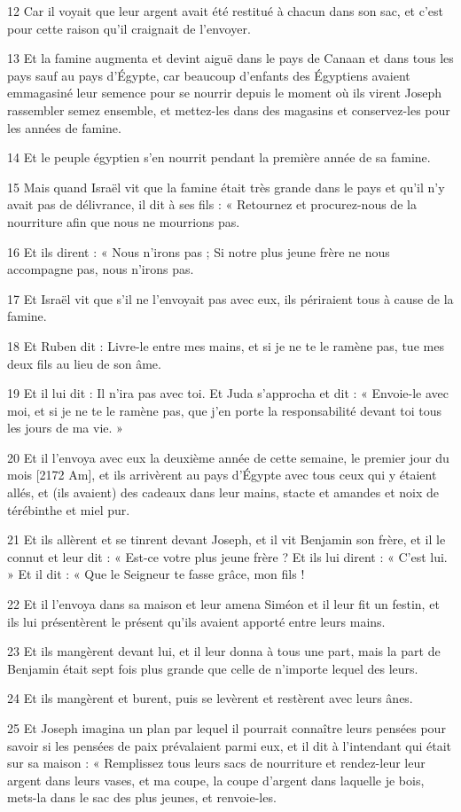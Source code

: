 \par 12 Car il voyait que leur argent avait été restitué à chacun dans son sac, et c'est pour cette raison qu'il craignait de l'envoyer.
\par 13 Et la famine augmenta et devint aiguë dans le pays de Canaan et dans tous les pays sauf au pays d'Égypte, car beaucoup d'enfants des Égyptiens avaient emmagasiné leur semence pour se nourrir depuis le moment où ils virent Joseph rassembler semez ensemble, et mettez-les dans des magasins et conservez-les pour les années de famine.
\par 14 Et le peuple égyptien s'en nourrit pendant la première année de sa famine.
\par 15 Mais quand Israël vit que la famine était très grande dans le pays et qu'il n'y avait pas de délivrance, il dit à ses fils : « Retournez et procurez-nous de la nourriture afin que nous ne mourrions pas.
\par 16 Et ils dirent : « Nous n'irons pas ; Si notre plus jeune frère ne nous accompagne pas, nous n'irons pas.
\par 17 Et Israël vit que s'il ne l'envoyait pas avec eux, ils périraient tous à cause de la famine.
\par 18 Et Ruben dit : Livre-le entre mes mains, et si je ne te le ramène pas, tue mes deux fils au lieu de son âme.
\par 19 Et il lui dit : Il n'ira pas avec toi. Et Juda s'approcha et dit : « Envoie-le avec moi, et si je ne te le ramène pas, que j'en porte la responsabilité devant toi tous les jours de ma vie. »
\par 20 Et il l'envoya avec eux la deuxième année de cette semaine, le premier jour du mois [2172 Am], et ils arrivèrent au pays d'Égypte avec tous ceux qui y étaient allés, et (ils avaient) des cadeaux dans leur mains, stacte et amandes et noix de térébinthe et miel pur.
\par 21 Et ils allèrent et se tinrent devant Joseph, et il vit Benjamin son frère, et il le connut et leur dit : « Est-ce votre plus jeune frère ? Et ils lui dirent : « C'est lui. » Et il dit : « Que le Seigneur te fasse grâce, mon fils !
\par 22 Et il l'envoya dans sa maison et leur amena Siméon et il leur fit un festin, et ils lui présentèrent le présent qu'ils avaient apporté entre leurs mains.
\par 23 Et ils mangèrent devant lui, et il leur donna à tous une part, mais la part de Benjamin était sept fois plus grande que celle de n'importe lequel des leurs.
\par 24 Et ils mangèrent et burent, puis se levèrent et restèrent avec leurs ânes.
\par 25 Et Joseph imagina un plan par lequel il pourrait connaître leurs pensées pour savoir si les pensées de paix prévalaient parmi eux, et il dit à l'intendant qui était sur sa maison : « Remplissez tous leurs sacs de nourriture et rendez-leur leur argent dans leurs vases, et ma coupe, la coupe d'argent dans laquelle je bois, mets-la dans le sac des plus jeunes, et renvoie-les.

